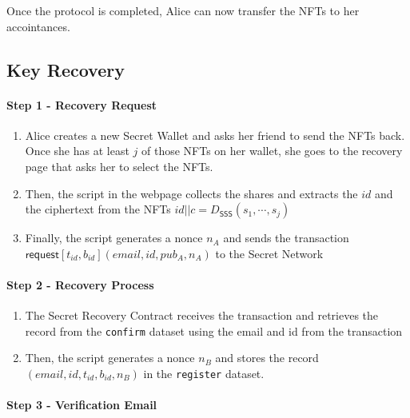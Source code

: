 \documentclass[12pt]{article}
\newcommand{\ms}[1]{\ensuremath{\mathsf{#1}}}
\newcommand{\tx}[3]{\ms{#1}[#2](#3)}
\begin{document}
\begin{enumerate}
Once the protocol is completed, Alice can now transfer the NFTs to her accointances. 

\subsection{Key Recovery}

\paragraph{Step 1 - Recovery Request}

\begin{enumerate}[label=1.\arabic*]
    \item Alice creates a new Secret Wallet and asks her friend to send the NFTs back. Once she has at least $j$ of those NFTs on her wallet, she goes to the recovery page that asks her to select the NFTs.
    \item Then, the script in the webpage collects the shares and extracts the $id$ and the ciphertext from the NFTs $id||c = D_{\ms{SSS}}(s_1,\cdots,s_j)$
    \item Finally, the script generates a nonce $n_A$ and sends the transaction $\tx{request}{t_{id}, b_{id}}{email, id, pub_A, n_A}$ to the Secret Network
\end{enumerate}

\paragraph{Step 2 - Recovery Process}

\begin{enumerate}[label=2.\arabic*]
    \item The Secret Recovery Contract receives the transaction and retrieves the record from the {\tt confirm} dataset using the email and id from the transaction
    \item Then, the script generates a nonce $n_B$ and stores the record $(email, id, t_{id}, b_{id}, n_B)$ in the {\tt register} dataset.
\end{enumerate}

\paragraph{Step 3 - Verification Email}


\end{enumerate}
\end{document}
